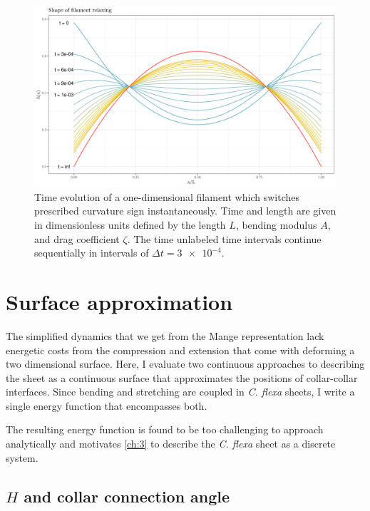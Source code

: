 \begin{figure}[bthp]
    \centering
    \includegraphics[width=\textwidth]{shapes.png}
    \caption[Dynamics of a one-dimensional filament model]{Time evolution of a one-dimensional filament which switches prescribed curvature sign instantaneously. Time and length are given in dimensionless units defined by the length $L$, bending modulus $A$, and drag coefficient $\zeta$. The time unlabeled time intervals continue sequentially in intervals of $\Delta t = \num{3e-4}$.}
    \label{fig:shapes}
\end{figure}

\section{Surface approximation}

The simplified dynamics that we get from the Mange representation lack energetic costs from the compression and extension that come with deforming a two dimensional surface. 
Here, I evaluate two continuous approaches to describing the sheet as a continuous surface that approximates the positions of collar-collar interfaces.
Since bending and stretching are coupled in \textit{C. flexa} sheets, I write a single energy function that encompasses both.

The resulting energy function is found to be too challenging to approach analytically and motivates \cref{ch:3} to describe the \textit{C. flexa} sheet as a discrete system.

\subsection{$H$ and collar connection angle} \label{subsec:h_phi}

